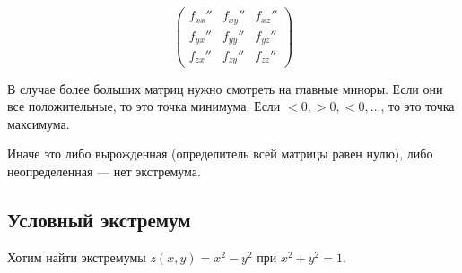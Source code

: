 \begin{remark}{}{}
    \[
        \begin{pmatrix}
            f_{xx}'' & f_{xy}'' & f_{xz}''
            \\
            f_{yx}'' & f_{yy}'' & f_{yz}''
            \\
            f_{zx}'' & f_{zy}'' & f_{zz}''
        \end{pmatrix}
    \]

    В случае более больших матриц нужно смотреть на главные миноры.
    Если они все положительные, то это точка минимума.
    Если \( < 0, > 0, < 0, \ldots \),
    то это точка максимума.

    Иначе это либо вырожденная (определитель всей матрицы равен нулю),
    либо неопределенная --- нет экстремума.
\end{remark}

\subsection{Условный экстремум}

\begin{example}{}{}
    Хотим найти экстремумы \( z(x, y) = x^2 - y^2 \) при \( x^2 + y^2 = 1 \).
\end{example}

